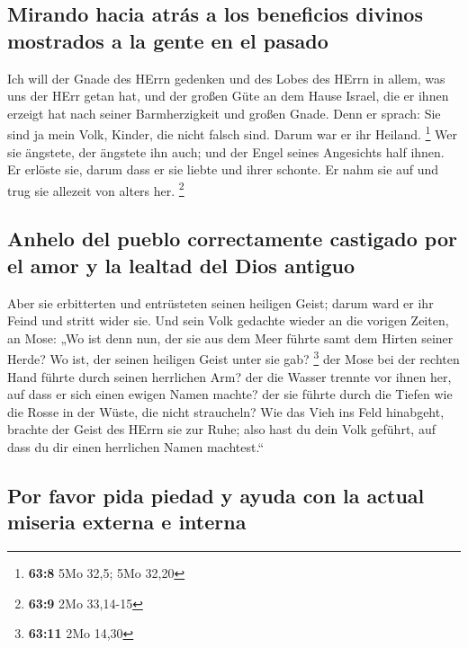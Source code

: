 \hypertarget{mirando-hacia-atruxe1s-a-los-beneficios-divinos-mostrados-a-la-gente-en-el-pasado}{%
\subsection{Mirando hacia atrás a los beneficios divinos mostrados a la
gente en el
pasado}\label{mirando-hacia-atruxe1s-a-los-beneficios-divinos-mostrados-a-la-gente-en-el-pasado}}

 Ich will der Gnade des HErrn gedenken und des Lobes des
HErrn in allem, was uns der HErr getan hat, und der großen Güte an dem
Hause Israel, die er ihnen erzeigt hat nach seiner Barmherzigkeit und
großen Gnade.  Denn er sprach: Sie sind ja mein Volk,
Kinder, die nicht falsch sind. Darum war er ihr Heiland. \footnote{\textbf{63:8}
  5Mo 32,5; 5Mo 32,20}  Wer sie ängstete, der ängstete ihn
auch; und der Engel seines Angesichts half ihnen. Er erlöste sie, darum
dass er sie liebte und ihrer schonte. Er nahm sie auf und trug sie
allezeit von alters her. \footnote{\textbf{63:9} 2Mo 33,14-15}

\hypertarget{anhelo-del-pueblo-correctamente-castigado-por-el-amor-y-la-lealtad-del-dios-antiguo}{%
\subsection{Anhelo del pueblo correctamente castigado por el amor y la
lealtad del Dios
antiguo}\label{anhelo-del-pueblo-correctamente-castigado-por-el-amor-y-la-lealtad-del-dios-antiguo}}

 Aber sie erbitterten und entrüsteten seinen heiligen
Geist; darum ward er ihr Feind und stritt wider sie.  Und
sein Volk gedachte wieder an die vorigen Zeiten, an Mose: „Wo ist denn
nun, der sie aus dem Meer führte samt dem Hirten seiner Herde? Wo ist,
der seinen heiligen Geist unter sie gab? \footnote{\textbf{63:11} 2Mo
  14,30}  der Mose bei der rechten Hand führte durch
seinen herrlichen Arm? der die Wasser trennte vor ihnen her, auf dass er
sich einen ewigen Namen machte?  der sie führte durch die
Tiefen wie die Rosse in der Wüste, die nicht straucheln? 
Wie das Vieh ins Feld hinabgeht, brachte der Geist des HErrn sie zur
Ruhe; also hast du dein Volk geführt, auf dass du dir einen herrlichen
Namen machtest.``

\hypertarget{por-favor-pida-piedad-y-ayuda-con-la-actual-miseria-externa-e-interna}{%
\subsection{Por favor pida piedad y ayuda con la actual miseria externa
e
interna}\label{por-favor-pida-piedad-y-ayuda-con-la-actual-miseria-externa-e-interna}}

